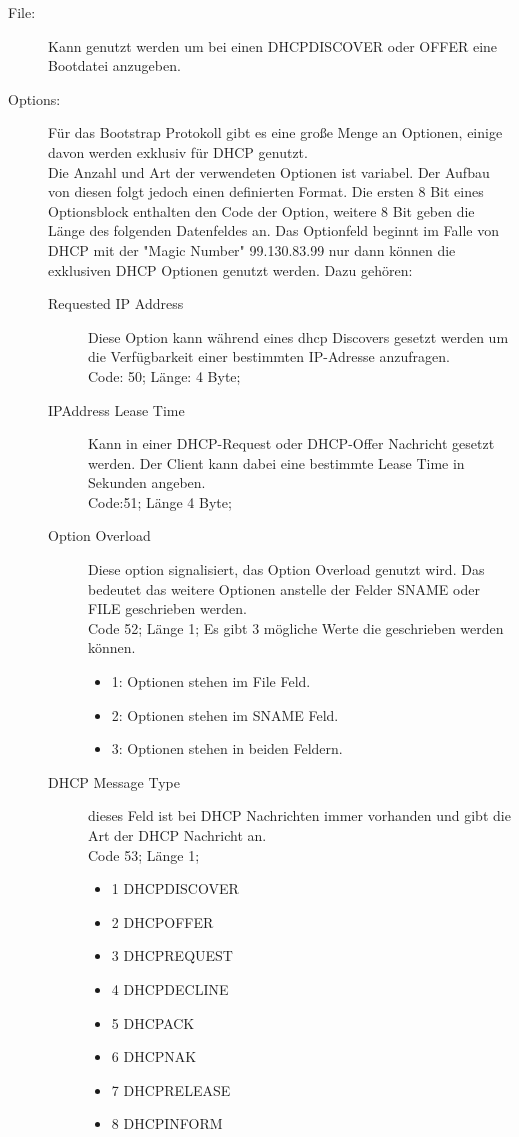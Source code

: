 \begin{description}
\item[File: ] Kann genutzt werden um bei einen DHCPDISCOVER oder OFFER eine Bootdatei anzugeben. 
\item[Options: ] Für das Bootstrap Protokoll gibt es eine große Menge an Optionen, einige davon werden exklusiv für DHCP genutzt. \\
Die Anzahl und Art der verwendeten Optionen ist variabel. Der Aufbau von diesen folgt jedoch einen definierten Format. Die ersten 8 Bit eines Optionsblock enthalten den Code der Option, weitere 8 Bit geben die Länge des folgenden Datenfeldes an. Das Optionfeld beginnt im Falle von DHCP mit der "Magic Number" 99.130.83.99 nur dann können die exklusiven DHCP Optionen genutzt werden.
Dazu gehören:
\begin{description}
	\item[Requested IP Address] Diese Option kann während eines dhcp Discovers gesetzt werden um die Verfügbarkeit einer bestimmten IP-Adresse anzufragen.\\
	Code: 50; Länge: 4 Byte;
	 
	\item[IPAddress Lease Time] Kann in einer DHCP-Request oder DHCP-Offer Nachricht gesetzt werden. Der Client kann dabei eine bestimmte Lease Time in Sekunden angeben.\\
	Code:51; Länge 4 Byte;
	
	\item[Option Overload] Diese option signalisiert, das Option Overload genutzt wird. Das bedeutet das weitere Optionen anstelle der Felder SNAME oder FILE geschrieben werden. \\
	Code 52; Länge 1;
	Es gibt 3 mögliche Werte die geschrieben werden können. 
	\begin{itemize}
		\item 1: Optionen stehen im File Feld. 
		\item 2: Optionen stehen im SNAME Feld.
		\item 3: Optionen stehen in beiden Feldern.
	\end{itemize}
	
	\item[DHCP Message Type] dieses Feld ist bei DHCP Nachrichten immer vorhanden und gibt die Art der DHCP Nachricht an. \\
	Code 53; Länge 1;
	\begin{itemize}
		\item 1 DHCPDISCOVER
		\item 2 DHCPOFFER
		\item 3 DHCPREQUEST
		\item 4 DHCPDECLINE
		\item 5 DHCPACK
		\item 6 DHCPNAK
		\item 7 DHCPRELEASE
		\item 8 DHCPINFORM		
		

\end{itemize}
\end{description}
\end{description}
